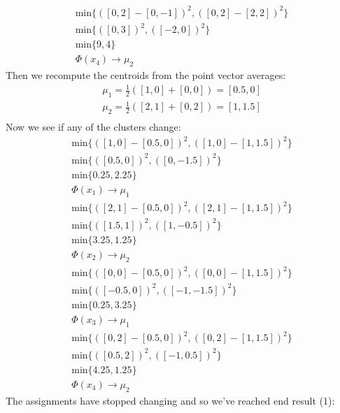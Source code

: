 \documentclass[12pt]{article}
\begin{document}
\begin{enumerate}[label=(\alph*)]
			\begin{gather*}
				\text{min} \{ ( [0,2] - [0, -1] )^2, ( [0,2] - [2, 2] )^2\} \\
				\text{min} \{ ( [0,3] )^2, ( [-2, 0] )^2\} \\
				\text{min} \{ 9, 4\} \\
				\Phi(x_4) \rightarrow \mu_2
			\end{gather*}
			Then we recompute the centroids from the point vector averages:
			\begin{gather*}
				\mu_1 = \frac{1}{2} ( [1,0] + [0, 0] ) =  [0.5, 0] \\
				\mu_2 = \frac{1}{2} ( [2,1] + [0, 2] ) =  [1, 1.5] \\
			\end{gather*}
			Now we see if any of the clusters change:
			\begin{gather*}
				\text{min} \{ ( [1,0] - [0.5, 0] )^2, ( [1,0] - [1, 1.5] )^2\} \\
				\text{min} \{ ( [0.5,0] )^2, ( [0, -1.5] )^2\} \\
				\text{min} \{ 0.25, 2.25\} \\
				\Phi(x_1) \rightarrow \mu_1
			\end{gather*}
			\begin{gather*}
				\text{min} \{ ( [2,1] - [0.5, 0] )^2, ( [2,1] - [1, 1.5] )^2\} \\
				\text{min} \{ ( [1.5,1] )^2, ( [1, -0.5] )^2\} \\
				\text{min} \{3.25, 1.25\} \\
				\Phi(x_2) \rightarrow \mu_2
			\end{gather*}
			\begin{gather*}
				\text{min} \{ ( [0,0] - [0.5, 0] )^2, ( [0,0] - [1, 1.5] )^2\} \\
				\text{min} \{ ( [-0.5,0] )^2, ( [-1, -1.5] )^2\} \\
				\text{min} \{ 0.25, 3.25\} \\
				\Phi(x_3) \rightarrow \mu_1
			\end{gather*}
			\begin{gather*}
				\text{min} \{ ( [0,2] - [0.5, 0] )^2, ( [0,2] - [1, 1.5] )^2\} \\
				\text{min} \{ ( [0.5,2] )^2, ( [-1, 0.5] )^2\} \\
				\text{min} \{ 4.25, 1.25\} \\
				\Phi(x_4) \rightarrow \mu_2
			\end{gather*}
			The assignments have stopped changing and so we've reached end result (1):

\end{enumerate}
\end{document}
